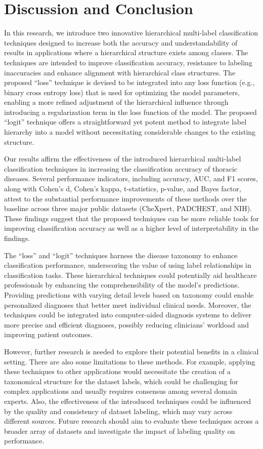 \documentclass[final,1p,times,authoryear]{elsarticle}
\begin{document}
\section{Discussion and Conclusion}\label{sec:taxonomy.discussion}
In this research, we introduce two innovative hierarchical multi-label classification techniques designed to increase both the accuracy and understandability of results in applications where a hierarchical structure exists among classes. The techniques are intended to improve classification accuracy, resistance to labeling inaccuracies and enhance alignment with hierarchical class structures. The proposed ``loss'' technique is devised to be integrated into any loss function (e.g., binary cross entropy loss) that is used for optimizing the model parameters, enabling a more refined adjustment of the hierarchical influence through introducing a regularization term in the loss function of the model. The proposed ``logit'' technique offers a straightforward yet potent method to integrate label hierarchy into a model without necessitating considerable changes to the existing structure.

Our results affirm the effectiveness of the introduced hierarchical multi-label classification techniques in increasing the classification accuracy of thoracic diseases. Several performance indicators, including accuracy, AUC, and F1 scores, along with Cohen's d, Cohen's kappa, t-statistics, p-value, and Bayes factor, attest to the substantial performance improvements of these methods over the baseline across three major public datasets (CheXpert, PADCHEST, and NIH). These findings suggest that the proposed techniques can be more reliable tools for improving classification accuracy as well as a higher level of interpretability in the findings.

The ``loss'' and ``logit'' techniques harness the disease taxonomy to enhance classification performance, underscoring the value of using label relationships in classification tasks. These hierarchical techniques could potentially aid healthcare professionals by enhancing the comprehensibility of the model's predictions. Providing predictions with varying detail levels based on taxonomy could enable personalized diagnoses that better meet individual clinical needs. Moreover, the techniques could be integrated into computer-aided diagnosis systems to deliver more precise and efficient diagnoses, possibly reducing clinicians' workload and improving patient outcomes.

However, further research is needed to explore their potential benefits in a clinical setting. There are also some limitations to these methods. For example, applying these techniques to other applications would necessitate the creation of a taxonomical structure for the dataset labels, which could be challenging for complex applications and usually requires consensus among several domain experts. Also, the effectiveness of the introduced techniques could be influenced by the quality and consistency of dataset labeling, which may vary across different sources. Future research should aim to evaluate these techniques across a broader array of datasets and investigate the impact of labeling quality on performance.
\end{document}
